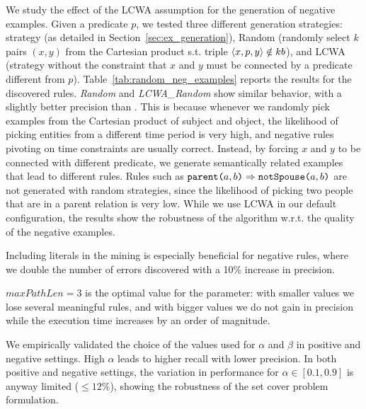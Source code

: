 \noindent {} We study the effect of the LCWA assumption for the generation of negative examples.
Given a predicate $p$, we tested three different generation strategies: \krd strategy (as detailed in Section~\ref{sec:ex_generation}), Random (randomly select $k$ pairs $(x,y)$ from the Cartesian product s.t. triple $\langle x,p,y\rangle \notin {\sc kb}$), and LCWA (\krd strategy without the constraint that $x$ and $y$ must be connected by a predicate different from $p$).
Table~\ref{tab:random_neg_examples} reports the results for the discovered rules. 
\emph{Random} and \emph{LCWA\_Random} show similar behavior, with a slightly better precision than \krd. This is because whenever we randomly pick examples from the Cartesian product of subject and object, the likelihood of picking entities from a different time period is very high, and negative rules pivoting on time constraints are usually correct. Instead, by forcing $x$ and $y$ to be connected with different predicate, we generate semantically related examples that lead to different rules. Rules such as $\texttt{parent(}a,b\texttt{)} \Rightarrow  \texttt{notSpouse(}a,b\texttt{)}$ are not generated with random strategies, since the likelihood of picking two people that are in a parent relation is very low. 
While we use LCWA in our default configuration, the results show the robustness of the algorithm w.r.t. the quality of the negative examples.


\noindent {} Including literals in the mining is especially beneficial for negative rules, where we double the number of errors discovered with a 10\% increase in precision.

\noindent {} $maxPathLen=3$ is the optimal value for the parameter: with smaller values we lose several meaningful rules, and with bigger values we do not gain in precision while  the execution time increases by an order of magnitude. %

\noindent {} We empirically validated the choice of the values used for $\alpha$ and $\beta$ in positive and negative settings. High $\alpha$ leads to higher recall with lower precision. In both positive and negative settings, the variation in performance for $\alpha \in [0.1,0.9]$ is anyway limited ($\leq 12\%$), showing the robustness of the set cover problem formulation.

